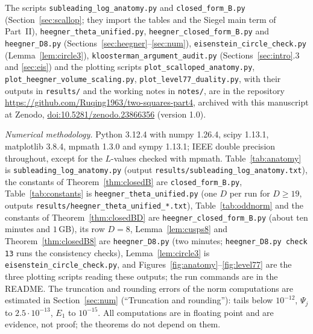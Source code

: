 \documentclass[11pt]{amsart}
\theoremstyle{remark}
\begin{document}
{\raggedright
The scripts \texttt{subleading\_log\_anatomy.py} and \texttt{closed\_form\_B.py} (Section~\ref{sec:scallop}; they import the tables and the Siegel main term of Part~II), \texttt{heegner\_theta\_unified.py}, \texttt{heegner\_closed\_form\_B.py} and \texttt{heegner\_D8.py} (Sections~\ref{sec:heegner}--\ref{sec:num}), \texttt{eisenstein\_circle\_check.py} (Lemma~\ref{lem:circle3}), \texttt{kloosterman\_argument\_audit.py} (Sections~\ref{sec:intro}.3 and \ref{sec:eis}) and the plotting scripts \texttt{plot\_scalloped\_anatomy.py}, \texttt{plot\_heegner\_volume\_scaling.py}, \texttt{plot\_level77\_duality.py}, with their outputs in \texttt{results/} and the working notes in \texttt{notes/}, are in the repository \url{https://github.com/Ruqing1963/two-squares-part4}, archived with this manuscript at Zenodo, \href{https://doi.org/10.5281/zenodo.23866356}{doi:10.5281/zenodo.23866356} (version 1.0).

\emph{Numerical methodology.} Python 3.12.4 with numpy 1.26.4, scipy 1.13.1, matplotlib 3.8.4, mpmath 1.3.0 and sympy 1.13.1; IEEE double precision throughout, except for the $L$-values checked with mpmath. Table~\ref{tab:anatomy} is \texttt{subleading\_log\_anatomy.py} (output \texttt{results/subleading\_log\_anatomy.txt}), the constants of Theorem~\ref{thm:closedB} are \texttt{closed\_form\_B.py}, Table~\ref{tab:constants} is \texttt{heegner\_theta\_unified.py} (one $D$ per run for $D\ge19$, outputs \texttt{results/heegner\_theta\_unified\_*.txt}), Table~\ref{tab:oddnorm} and the constants of Theorem~\ref{thm:closedBD} are \texttt{heegner\_closed\_form\_B.py} (about ten minutes and $1$\,GB), its row $D=8$, Lemma~\ref{lem:cusps8} and Theorem~\ref{thm:closedB8} are \texttt{heegner\_D8.py} (two minutes; \texttt{heegner\_D8.py check 13} runs the consistency checks), Lemma~\ref{lem:circle3} is \texttt{eisenstein\_circle\_check.py}, and Figures~\ref{fig:anatomy}--\ref{fig:level77} are the three plotting scripts reading these outputs; the run commands are in the README. The truncation and rounding errors of the norm computations are estimated in Section~\ref{sec:num} (``Truncation and rounding''): tails below $10^{-12}$, $\Psi_j$ to $2.5\cdot10^{-13}$, $E_1$ to $10^{-15}$. All computations are in floating point and are evidence, not proof; the theorems do not depend on them.
\par}
\end{document}
